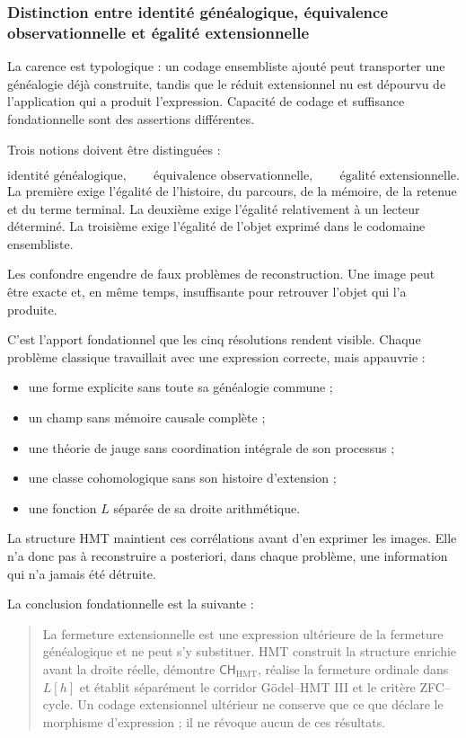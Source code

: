 \subsubsection{Distinction entre identité généalogique, équivalence observationnelle et égalité extensionnelle}
La carence est typologique : un codage ensembliste ajouté peut transporter une généalogie déjà construite, tandis que le réduit extensionnel nu est dépourvu de l’application qui a produit l’expression. Capacité de codage et suffisance fondationnelle sont des assertions différentes.\par
Trois notions doivent être distinguées :\par
\[
\text{identité généalogique},
\qquad
\text{équivalence observationnelle},
\qquad
\text{égalité extensionnelle}.
\]
La première exige l’égalité de l’histoire, du parcours, de la mémoire, de la retenue et du terme terminal. La deuxième exige l’égalité relativement à un lecteur déterminé. La troisième exige l’égalité de l’objet exprimé dans le codomaine ensembliste.\par
Les confondre engendre de faux problèmes de reconstruction. Une image peut être exacte et, en même temps, insuffisante pour retrouver l’objet qui l’a produite.\par
C’est l’apport fondationnel que les cinq résolutions rendent visible. Chaque problème classique travaillait avec une expression correcte, mais appauvrie :\par
\begin{itemize}
\item une forme explicite sans toute sa généalogie commune ;
\item un champ sans mémoire causale complète ;
\item une théorie de jauge sans coordination intégrale de son processus ;
\item une classe cohomologique sans son histoire d’extension ;
\item une fonction \(L\) séparée de sa droite arithmétique.
\end{itemize}
La structure HMT maintient ces corrélations avant d’en exprimer les images. Elle n’a donc pas à reconstruire a posteriori, dans chaque problème, une information qui n’a jamais été détruite.\par
La conclusion fondationnelle est la suivante :\par
\begin{quote}
La fermeture extensionnelle est une expression ultérieure de la fermeture généalogique et ne peut s’y substituer. HMT construit la structure enrichie avant la droite réelle, démontre \(\mathsf{CH}_{\mathrm{HMT}}\), réalise la fermeture ordinale dans \(L[h]\) et établit séparément le corridor Gödel--HMT III et le critère ZFC--cycle. Un codage extensionnel ultérieur ne conserve que ce que déclare le morphisme d’expression ; il ne révoque aucun de ces résultats.\par
\end{quote}
